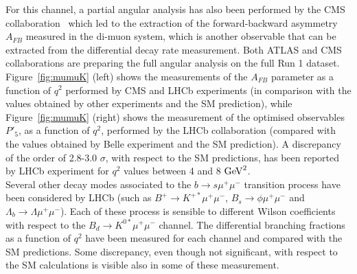 \documentclass{PoS}
\begin{document}
For this channel, a partial angular analysis has also been performed by the CMS collaboration~\cite{mumuK_CMS} which led to the extraction of the forward-backward asymmetry $A_{FB}$  measured in the di-muon system, which is another observable that can be extracted from the differential decay rate measurement. Both ATLAS and CMS collaborations are preparing the full angular analysis on the full Run 1 dataset.  Figure~\ref{fig:mumuK} (left) shows the measurements of the $A_{FB}$ parameter as a function of $q^2$ performed by CMS and LHCb experiments (in comparison with the values obtained by other experiments and the SM prediction), while Figure~\ref{fig:mumuK} (right) shows the measurement of the optimised observables $P'_5$, as a function of $q^2$,  performed by the LHCb collaboration (compared with the values obtained by Belle experiment and the SM prediction). A discrepancy of the order of 2.8-3.0 $\sigma$, with respect to the SM predictions, has been reported by LHCb experiment for $q^2$ values between 4 and 8 ${\rm{GeV}}^2$.\\
Several other decay modes associated to the $b \to s \mu^+ \mu^-$ transition process have been considered by LHCb (such as $B^+ \to K^{+*} \mu^+ \mu^-$, $B_s \to  \phi \mu^+ \mu^-$ and $\Lambda_b \to \Lambda \mu^+ \mu^-$). Each of these process is sensible to different Wilson coefficients with respect to the $B_d \to  K^{0*} \mu^+ \mu^-$ channel. The differential branching fractions as a function of $q^2$ have been measured for each channel and compared with the SM predictions. Some discrepancy, even though not significant, with respect to the SM calculations is visible also in some of these measurement.\\
\end{document}
